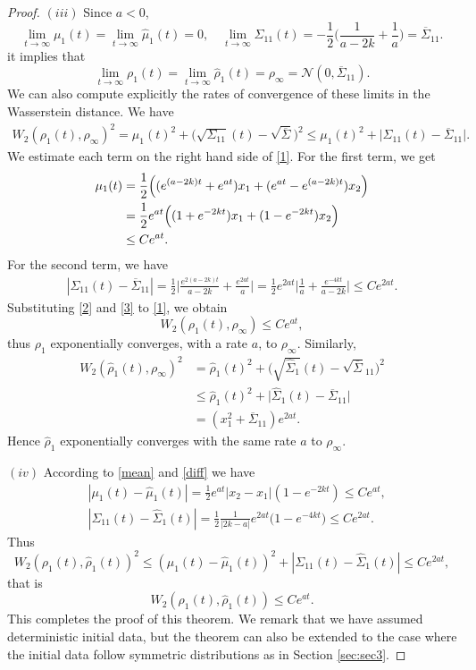 \documentclass[a4paper,twoside]{article}      %
\theoremstyle{definition}
\begin{document}
\begin{proof}
$(iii)$
Since $a<0$,
$$
\lim_{t\rightarrow\infty}\mu_1(t)=\lim_{t\rightarrow \infty}\hat{\mu}_1(t)=0,\quad
\lim_{t\rightarrow\infty}\Sigma_{11}(t)=-\frac{1}{2}\Big(\frac{1}{a-2k}+\frac{1}{a}\Big)=\overline{\Sigma}_{11}.
$$
it implies that
$$
\lim_{t\rightarrow \infty} \rho_1(t)=\lim_{t\rightarrow \infty} \hat{\rho}_1(t)=\rho_\infty=\mathcal{N}(0,\overline{\Sigma}_{11}).
$$
We can also compute explicitly the rates of convergence of these limits in the Wasserstein distance. We have
\begin{align}
\label{1}
 W_2(\rho_1(t),\rho_\infty)^2=\mu_1(t)^2+\Big(\sqrt{\Sigma_{11}}(t)-\sqrt{\overline{\Sigma}}\Big)^2   \leq \mu_1(t)^2+\Big|\Sigma_{11}(t)-\overline{\Sigma}_{11}\Big|.
\end{align}
We estimate each term on the right hand side of \eqref{1}. For the first term, we get
\begin{align}
\label{2}
 \mu_1(t) &=\frac{1}{2}\Big((e^{(a-2k)t}+e^{at})x_1+( e^{at} -e^{(a-2k)t})x_2\Big)\notag
 \\&=\frac{1}{2}e^{at}\Big((1+e^{-2kt})x_1+(1-e^{-2kt})x_2\Big)\notag
 \\& \leq C e^{at}.
\end{align}
For the second term, we have
\begin{align}
\label{3}
 |\Sigma_{11}(t)-\overline{\Sigma}_{11}|=\frac{1}{2}\Big|\frac{e^{2(a-2k)t}}{a-2k}+\frac{e^{2at}}{a}\Big|=\frac{1}{2}e^{2at}\Big|\frac{1}{a}+\frac{e^{-4kt}}{a-2k}\Big|\leq C e^{2at}.   
\end{align}
Substituting \eqref{2} and \eqref{3} to \eqref{1}, we obtain
$$
W_2(\rho_1(t),\rho_\infty)\leq C e^{at},
$$
thus $\rho_1$ exponentially converges, with a rate $a$, to $\rho_\infty$. Similarly,
\begin{align*}
 W_2(\hat{\rho}_1(t),\rho_\infty)^2&=\hat{\rho}_1(t)^2+\Big(\sqrt{\hat{\Sigma}_1}(t)-\sqrt{\overline{\Sigma}}_{11}\Big)^2
 \\&\leq \hat{\rho}_1(t)^2+\Big|\hat{\Sigma}_1(t)-\overline{\Sigma}_{11}\Big|
 \\& =(x_1^2 +\overline{\Sigma}_{11}) e^{2at}.
\end{align*}
Hence $\hat{\rho}_1$ exponentially converges with the same rate  $a$ to $\rho_\infty$.

$(iv)$ According to \eqref{mean} and \eqref{diff} we have
\begin{align*}
&|\mu_1(t)-\hat{\mu}_1(t)|=  \frac{1}{2}e^{at}|x_2-x_1|(1-e^{-2kt})\leq C e^{at},
\\& |\Sigma_{11}(t)-\hat{\Sigma}_{1}(t)|=\frac{1}{2}\frac{1}{|2k-a|}e^{2at}\Big(1-e^{-4kt}\Big)\leq C e^{2at}.
\end{align*}
Thus
\begin{equation*}
 W_2(\rho_1(t),\hat{\rho}_1(t))^2\leq (\mu_1(t)-\hat{\mu}_1(t))^2+|\Sigma_{11}(t)-\hat{\Sigma}_{1}(t)|\leq C e^{2at},
\end{equation*}
that is 
$$
W_2(\rho_1(t),\hat{\rho}_1(t))\leq C e^{at}.$$
This completes the proof of this theorem. We remark that we have assumed deterministic initial data, but the theorem can also be extended to the case where the initial data follow symmetric distributions as in Section \ref{sec:sec3}.
\end{proof}
\end{document}
